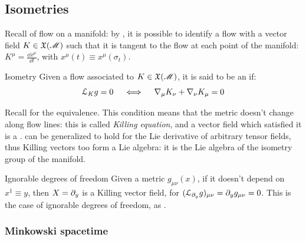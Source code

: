 \subsection{Isometries}
\label{ssec:isometries}

Recall  of flow on a manifold: by , it is possible to identify a flow with a vector field $ K \in \mathfrak{X}(\mathscr{M}) $ such that it is tangent to the flow at each point of the manifold: $ K^\mu = \frac{\dd x^\mu}{\dd t} $, with $ x^\mu(t) \equiv x^\mu(\sigma_t) $.

\begin{definition}{Isometry}{}
  Given a flow associated to $ K \in \mathfrak{X}(\mathscr{M}) $, it is said to be an  if:
  \begin{equation}
    \EuScript{L}_K g = 0
    \quad \iff \quad
    \nabla_\mu K_\nu + \nabla_\nu K_\mu = 0
    \label{eq:killing}
  \end{equation}
\end{definition}
Recall  for the equivalence. This condition means that the metric doesn't change along flow lines: this is called \textit{Killing equation}, and a vector field which satisfied it is a .
 can be generalized to hold for the Lie derivative of arbitrary tensor fields, thus Killing vectors too form a Lie algebra: it is the Lie algebra of the isometry group of the manifold.

\begin{example}{Ignorable degrees of freedom}{}
  Given a metric $ g_{\mu \nu}(x) $, if it doesn't depend on $ x^1 \equiv y $, then $ X = \partial_y $ is a Killing vector field, for $ (\EuScript{L}_{\partial_y} g)_{\mu \nu} = \partial_y g_{\mu \nu} = 0 $. This is the case of ignorable degrees of freedom, as .
\end{example}

\subsubsection{Minkowski spacetime}


